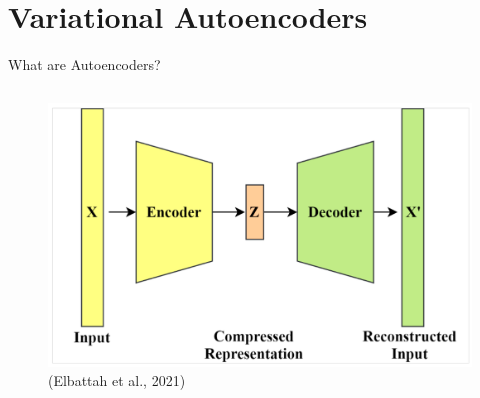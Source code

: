 \documentclass[aspectratio=169,xcolor=dvipsnames]{beamer}
\begin{document}
\section{Variational Autoencoders}
\begin{frame}{What are Autoencoders?}
  \begin{columns}
    \begin{column}{0.7\textwidth}
      \centering
      \begin{figure}
        \centering
        \includegraphics[width=\textwidth]{figures/VAE_figure.png}
        \caption{(Elbattah et al., 2021)}
      \end{figure}
    \end{column}
  \end{columns}
\end{frame}
\end{document}
